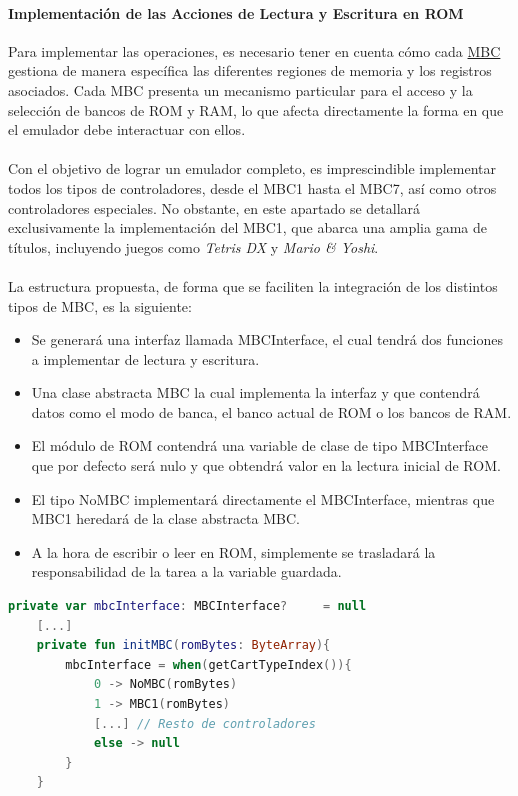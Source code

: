 \paragraph{Implementación de las Acciones de Lectura y Escritura en ROM}
Para implementar las operaciones, es necesario tener en cuenta cómo cada \hyperref[history_mbcs]{MBC} gestiona de manera específica las diferentes regiones de memoria y los registros asociados. Cada MBC presenta un mecanismo particular para el acceso y la selección de bancos de ROM y RAM, lo que afecta directamente la forma en que el emulador debe interactuar con ellos.
\\\\
Con el objetivo de lograr un emulador completo, es imprescindible implementar todos los tipos de controladores, desde el MBC1 hasta el MBC7, así como otros controladores especiales. No obstante, en este apartado se detallará exclusivamente la implementación del MBC1, que abarca una amplia gama de títulos, incluyendo juegos como \textit{Tetris DX} y \textit{Mario \& Yoshi}.
\\\\
La estructura propuesta, de forma que se faciliten la integración de los distintos tipos de MBC, es la siguiente:
\begin{itemize}
    \item Se generará una interfaz llamada MBCInterface, el cual tendrá dos funciones a implementar de lectura y escritura.
    \item Una clase abstracta MBC la cual implementa la interfaz y que contendrá datos como el modo de banca, el banco actual de ROM o los bancos de RAM.
    \item El módulo de ROM contendrá una variable de clase de tipo MBCInterface que por defecto será nulo y que obtendrá valor en la lectura inicial de ROM.
    \item El tipo NoMBC implementará directamente el MBCInterface, mientras que MBC1 heredará de la clase abstracta MBC.
    \item A la hora de escribir o leer en ROM, simplemente se trasladará la responsabilidad de la tarea a la variable guardada.
\end{itemize}

\begin{lstlisting}[language=Kotlin, caption={Inicialización del MBC.}, label={code:initmbc}]
    private var mbcInterface: MBCInterface?     = null
    [...]
    private fun initMBC(romBytes: ByteArray){
        mbcInterface = when(getCartTypeIndex()){
            0 -> NoMBC(romBytes)
            1 -> MBC1(romBytes)
            [...] // Resto de controladores
            else -> null
        }
    }   
\end{lstlisting}


